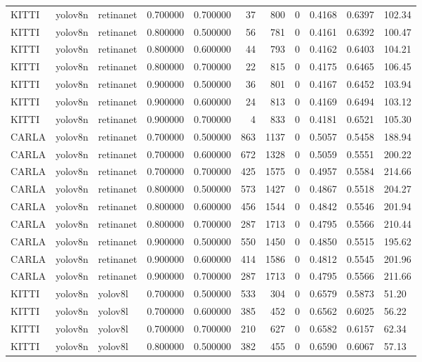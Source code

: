 \begin{tabular}{lllrrrrrlll}
KITTI & yolov8n & retinanet & 0.700000 & 0.700000 & 37 & 800 & 0 & 0.4168 & 0.6397 & 102.34 \\
KITTI & yolov8n & retinanet & 0.800000 & 0.500000 & 56 & 781 & 0 & 0.4161 & 0.6392 & 100.47 \\
KITTI & yolov8n & retinanet & 0.800000 & 0.600000 & 44 & 793 & 0 & 0.4162 & 0.6403 & 104.21 \\
KITTI & yolov8n & retinanet & 0.800000 & 0.700000 & 22 & 815 & 0 & 0.4175 & 0.6465 & 106.45 \\
KITTI & yolov8n & retinanet & 0.900000 & 0.500000 & 36 & 801 & 0 & 0.4167 & 0.6452 & 103.94 \\
KITTI & yolov8n & retinanet & 0.900000 & 0.600000 & 24 & 813 & 0 & 0.4169 & 0.6494 & 103.12 \\
KITTI & yolov8n & retinanet & 0.900000 & 0.700000 & 4 & 833 & 0 & 0.4181 & 0.6521 & 105.30 \\
CARLA & yolov8n & retinanet & 0.700000 & 0.500000 & 863 & 1137 & 0 & 0.5057 & 0.5458 & 188.94 \\
CARLA & yolov8n & retinanet & 0.700000 & 0.600000 & 672 & 1328 & 0 & 0.5059 & 0.5551 & 200.22 \\
CARLA & yolov8n & retinanet & 0.700000 & 0.700000 & 425 & 1575 & 0 & 0.4957 & 0.5584 & 214.66 \\
CARLA & yolov8n & retinanet & 0.800000 & 0.500000 & 573 & 1427 & 0 & 0.4867 & 0.5518 & 204.27 \\
CARLA & yolov8n & retinanet & 0.800000 & 0.600000 & 456 & 1544 & 0 & 0.4842 & 0.5546 & 201.94 \\
CARLA & yolov8n & retinanet & 0.800000 & 0.700000 & 287 & 1713 & 0 & 0.4795 & 0.5566 & 210.44 \\
CARLA & yolov8n & retinanet & 0.900000 & 0.500000 & 550 & 1450 & 0 & 0.4850 & 0.5515 & 195.62 \\
CARLA & yolov8n & retinanet & 0.900000 & 0.600000 & 414 & 1586 & 0 & 0.4812 & 0.5545 & 201.96 \\
CARLA & yolov8n & retinanet & 0.900000 & 0.700000 & 287 & 1713 & 0 & 0.4795 & 0.5566 & 211.66 \\
KITTI & yolov8n & yolov8l & 0.700000 & 0.500000 & 533 & 304 & 0 & 0.6579 & 0.5873 & 51.20 \\
KITTI & yolov8n & yolov8l & 0.700000 & 0.600000 & 385 & 452 & 0 & 0.6562 & 0.6025 & 56.22 \\
KITTI & yolov8n & yolov8l & 0.700000 & 0.700000 & 210 & 627 & 0 & 0.6582 & 0.6157 & 62.34 \\
KITTI & yolov8n & yolov8l & 0.800000 & 0.500000 & 382 & 455 & 0 & 0.6590 & 0.6067 & 57.13 \\

\end{tabular}
